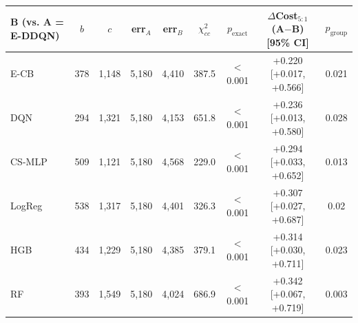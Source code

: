 \begin{tabular}{lcccccccc}
\toprule
B (vs. A = E-DDQN) & $b$ & $c$ & err$_A$ & err$_B$ & $\chi^2_{cc}$ & $p_{\text{exact}}$ & $\Delta$Cost$_{5:1}$ (A$-$B) [95\% CI] & $p_{\text{group}}$ \\
\midrule
E-CB & 378 & 1,148 & 5,180 & 4,410 & 387.5 & $<$0.001 & +0.220 [+0.017, +0.566] & 0.021 \\
DQN & 294 & 1,321 & 5,180 & 4,153 & 651.8 & $<$0.001 & +0.236 [+0.013, +0.580] & 0.028 \\
CS-MLP & 509 & 1,121 & 5,180 & 4,568 & 229.0 & $<$0.001 & +0.294 [+0.033, +0.652] & 0.013 \\
LogReg & 538 & 1,317 & 5,180 & 4,401 & 326.3 & $<$0.001 & +0.307 [+0.027, +0.687] & 0.02 \\
HGB & 434 & 1,229 & 5,180 & 4,385 & 379.1 & $<$0.001 & +0.314 [+0.030, +0.711] & 0.023 \\
RF & 393 & 1,549 & 5,180 & 4,024 & 686.9 & $<$0.001 & +0.342 [+0.067, +0.719] & 0.003 \\
\bottomrule
\end{tabular}
